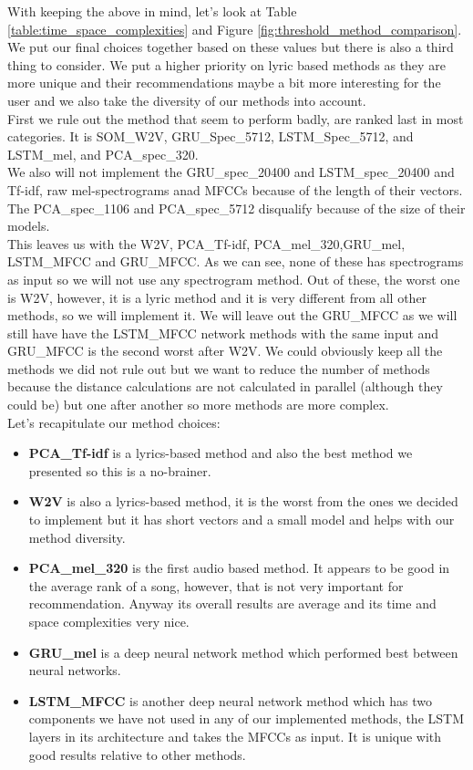 With keeping the above in mind, let's look at Table \ref{table:time_space_complexities} and Figure \ref{fig:threshold_method_comparison}. We put our final choices together based on these values but there is also a third thing to consider. We put a higher priority on lyric based methods as they are more unique and their recommendations maybe a bit more interesting for the user and we also take the diversity of our methods into account. \\
First we rule out the method that seem to perform badly, are ranked last in most categories. It is SOM\_W2V, GRU\_Spec\_5712, LSTM\_Spec\_5712, and LSTM\_mel, and PCA\_spec\_320. \\
We also will not implement the GRU\_spec\_20400 and LSTM\_spec\_20400 and Tf-idf, raw mel-spectrograms anad MFCCs because of the length of their vectors. The PCA\_spec\_1106 and PCA\_spec\_5712 disqualify because of the size of their models. \\
This leaves us with the W2V, PCA\_Tf-idf, PCA\_mel\_320,GRU\_mel, LSTM\_MFCC and GRU\_MFCC. As we can see, none of these has spectrograms as input so we will not use any spectrogram method. Out of these, the worst one is W2V, however, it is a lyric method and it is very different from all other methods, so we will implement it. We will leave out the GRU\_MFCC as we will still have have the LSTM\_MFCC network methods with the same input and GRU\_MFCC is the second worst after W2V. We could obviously keep all the methods we did not rule out but we want to reduce the number of methods because the distance calculations are not calculated in parallel (although they could be) but one after another so more methods are more complex. \\
Let's recapitulate our method choices:
\begin{itemize}
    \item \textbf{PCA\_Tf-idf} is a lyrics-based method and also the best method we presented so this is a no-brainer.
    \item \textbf{W2V} is also a lyrics-based method, it is the worst from the ones we decided to implement but it has short vectors and a small model and helps with our method diversity.
    \item \textbf{PCA\_mel\_320} is the first audio based method. It appears to be good in the average rank of a song, however, that is not very important for recommendation. Anyway its overall results are average and its time and space complexities very nice.
    \item \textbf{GRU\_mel} is a deep neural network method which performed best between neural networks.
    \item \textbf{LSTM\_MFCC} is another deep neural network method which has two components we have not used in any of our implemented methods, the LSTM layers in its architecture and takes the MFCCs as input. It is unique with good results relative to other methods. 
\end{itemize}

